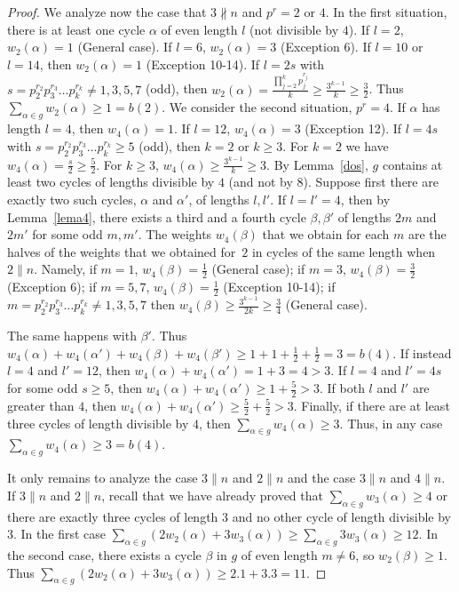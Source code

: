\documentclass[10pt,a4paper]{amsart}
\renewcommand{\sigma}{g}
\theoremstyle{plain}
\theoremstyle{definition}
\theoremstyle{remark}
\begin{document}
\begin{proof}
We analyze now the case that $3\nparallel n$ and $p^r=2$ or $4$. In the first situation, there is at least one cycle $\alpha$ of even length $l$ (not divisible by $4$). If $l=2$, $w_2(\alpha)=1$ (General case). If $l=6$, $w_2(\alpha)=3$ (Exception 6). If $l=10$ or $l=14$, then $w_2(\alpha)=1$ (Exception 10-14). If $l=2s$ with $s=p_2^{r_2}p_3^{r_3}\ldots p_k^{r_k}\neq 1,3,5,7$ (odd), then $w_2(\alpha)=\frac{\prod\limits_{j=2}^k p_j^{r_j}}{k}\ge \frac{3^{k-1}}{k}\ge \frac{3}{2}$. Thus $\sum\limits_{\alpha \in \sigma} w_{2}(\alpha)\ge 1= b(2)$. We consider the second situation, $p^r=4$. If $\alpha$ has length $l=4$, then $w_4(\alpha)=1$. If $l=12$, $w_4(\alpha)=3$ (Exception 12). If $l=4s$ with $s=p_2^{r_2}p_3^{r_3}\ldots p_k^{r_k}\ge 5$ (odd), then $k=2$ or $k\ge 3$. For $k=2$ we have $w_4(\alpha)=\frac{s}{2}\ge \frac{5}{2}$. For $k\ge 3$, $w_4(\alpha)\ge \frac{3^{k-1}}{k}\ge 3$. By Lemma~\ref{dos}, $\sigma$ contains at least two cycles of lengths divisible by $4$ (and not by $8$). Suppose first there are exactly two such cycles, $\alpha$ and $\alpha'$, of lengths $l,l'$. If $l=l'=4$, then by Lemma~\ref{lema4}, there exists a third and a fourth cycle $\beta, \beta'$ of lengths $2m$ and $2m'$ for some odd $m,m'$. The weights $w_4(\beta)$ that we obtain for each $m$ are the halves of the weights that we obtained for~$2$ in cycles of the same length when $2\parallel n$. Namely, if $m=1$, $w_4(\beta)=\frac{1}{2}$ (General case); if $m=3$, $w_4(\beta)=\frac{3}{2}$ (Exception 6); if $m=5,7$, $w_4(\beta)=\frac{1}{2}$ (Exception 10-14); if $m=p_2^{r_2}p_3^{r_3}\ldots p_k^{r_k}\neq 1,3,5,7$ then $w_4(\beta)\ge \frac{3^{k-1}}{2k}\ge \frac{3}{4}$ (General case).

The same happens with $\beta'$. Thus $w_4(\alpha)+w_4(\alpha')+w_4(\beta)+w_4(\beta')\ge 1+1+\frac{1}{2}+\frac{1}{2}=3=b(4)$. If instead $l=4$ and $l'=12$, then $w_4(\alpha)+w_4(\alpha')=1+3=4> 3$. If $l=4$ and $l'=4s$ for some odd $s\ge 5$, then $w_4(\alpha)+w_4(\alpha')\ge 1+\frac{5}{2}>3$. If both $l$ and $l'$ are greater than $4$, then $w_4(\alpha)+w_4(\alpha')\ge \frac{5}{2}+\frac{5}{2}>3$. Finally, if there are at least three cycles of length divisible by $4$, then $\sum\limits_{\alpha \in \sigma} w_4(\alpha)\ge 3$. Thus, in any case $\sum\limits_{\alpha \in \sigma} w_4(\alpha)\ge 3=b(4)$.

It only remains to analyze the case $3\parallel n$ and $2\parallel n$ and the case $3\parallel n$ and $4\parallel n$.        
If $3\parallel n$ and $2\parallel n$, recall that we have already proved that $\sum\limits_{\alpha \in \sigma} w_{3}(\alpha)\ge 4$ or there are exactly three cycles of length $3$ and no other cycle of length divisible by $3$. In the first case $\sum\limits_{\alpha \in \sigma} (2w_{2}(\alpha)+3w_{3}(\alpha))\ge \sum\limits_{\alpha \in \sigma} 3w_{3}(\alpha)\ge 12$. In the second case, there exists a cycle $\beta$ in $\sigma$ of even length $m\neq 6$, so $w_2(\beta)\ge 1$. Thus $\sum\limits_{\alpha \in \sigma} (2w_{2}(\alpha)+3w_{3}(\alpha))\ge 2.1+3.3= 11$. 


\end{proof}
\end{document}
